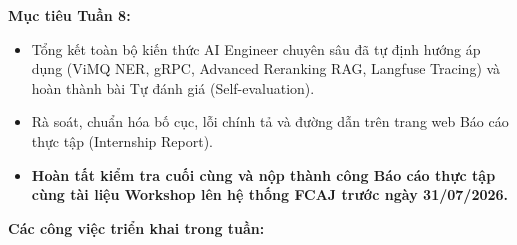 \vspace{0.5em}\noindent\textbf{Mục tiêu Tuần 8:}

\begin{itemize}
\tightlist
\item
  Tổng kết toàn bộ kiến thức AI Engineer chuyên sâu đã tự định hướng áp
  dụng (ViMQ NER, gRPC, Advanced Reranking RAG, Langfuse Tracing) và
  hoàn thành bài Tự đánh giá (Self-evaluation).
\item
  Rà soát, chuẩn hóa bố cục, lỗi chính tả và đường dẫn trên trang web
  Báo cáo thực tập (Internship Report).
\item
  \textbf{Hoàn tất kiểm tra cuối cùng và nộp thành công Báo cáo thực tập
  cùng tài liệu Workshop lên hệ thống FCAJ trước ngày 31/07/2026.}
\end{itemize}

\vspace{0.5em}\noindent\textbf{Các công việc triển khai trong tuần:}

